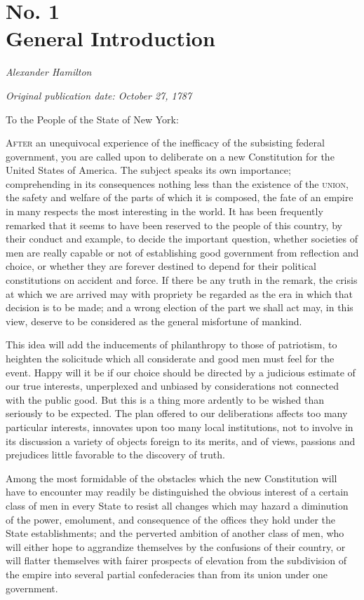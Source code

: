 \chapter[No. 1: General Introduction]{No. 1\\ {\small General Introduction}}

\textit{Alexander Hamilton}

\textit{Original publication date: October 27, 1787}
\vspace{1cm}

To the People of the State of New York:
\vspace{.4cm}

\textsc{After} an unequivocal experience of the inefficacy of the subsisting federal government, you are called upon to deliberate on a new Constitution for the United States of America. 
The subject speaks its own importance; comprehending in its consequences nothing less than the existence of the \textsc{union}, the safety and welfare of the parts of which it is composed, the fate of an empire in many respects the most interesting in the world. 
It has been frequently remarked that it seems to have been reserved to the people of this country, by their conduct and example, to decide the important question, whether societies of men are really capable or not of establishing good government from reflection and choice, or whether they are forever destined to depend for their political constitutions on accident and force. 
If there be any truth in the remark, the crisis at which we are arrived may with propriety be regarded as the era in which that decision is to be made; and a wrong election of the part we shall act may, in this view, deserve to be considered as the general misfortune of mankind.

This idea will add the inducements of philanthropy to those of patriotism, to heighten the solicitude which all considerate and good men must feel for the event. 
Happy will it be if our choice should be directed by a judicious estimate of our true interests, unperplexed and unbiased by considerations not connected with the public good. 
But this is a thing more ardently to be wished than seriously to be expected. 
The plan offered to our deliberations affects too many particular interests, innovates upon too many local institutions, not to involve in its discussion a variety of objects foreign to its merits, and of views, passions and prejudices little favorable to the discovery of truth.

Among the most formidable of the obstacles which the new Constitution will have to encounter may readily be distinguished the obvious interest of a certain class of men in every State to resist all changes which may hazard a diminution of the power, emolument, and consequence of the offices they hold under the State establishments; and the perverted ambition of another class of men, who will either hope to aggrandize themselves by the confusions of their country, or will flatter themselves with fairer prospects of elevation from the subdivision of the empire into several partial confederacies than from its union under one government.

